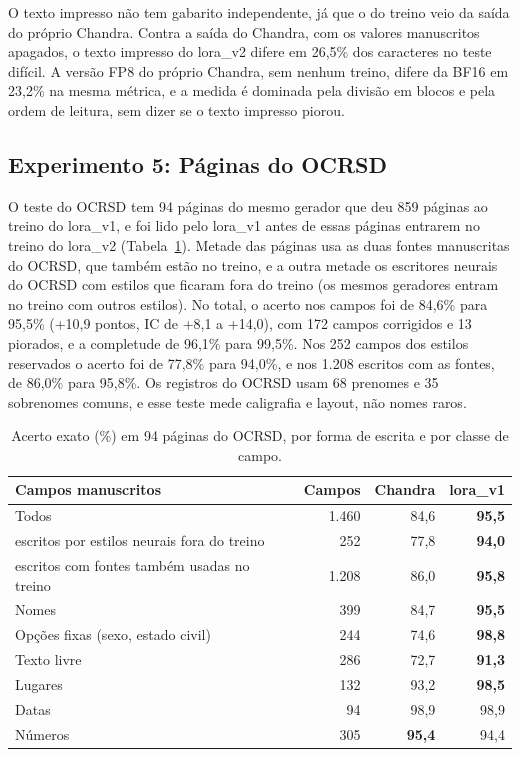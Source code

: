 O texto impresso não tem gabarito independente, já que o do treino veio da saída do próprio Chandra. Contra a saída do Chandra, com os valores manuscritos apagados, o texto impresso do lora\_v2 difere em 26,5\% dos caracteres no teste difícil. A versão FP8 do próprio Chandra, sem nenhum treino, difere da BF16 em 23,2\% na mesma métrica, e a medida é dominada pela divisão em blocos e pela ordem de leitura, sem dizer se o texto impresso piorou.

\subsection{Experimento 5: Páginas do OCRSD}
\label{subsec:exp5}

O teste do OCRSD tem 94 páginas do mesmo gerador que deu 859 páginas ao treino do lora\_v1, e foi lido pelo lora\_v1 antes de essas páginas entrarem no treino do lora\_v2 (Tabela~\ref{tab:ocrsd}). Metade das páginas usa as duas fontes manuscritas do OCRSD, que também estão no treino, e a outra metade os escritores neurais do OCRSD com estilos que ficaram fora do treino (os mesmos geradores entram no treino com outros estilos). No total, o acerto nos campos foi de 84,6\% para 95,5\% (+10,9 pontos, IC de +8,1 a +14,0), com 172 campos corrigidos e 13 piorados, e a completude de 96,1\% para 99,5\%. Nos 252 campos dos estilos reservados o acerto foi de 77,8\% para 94,0\%, e nos 1.208 escritos com as fontes, de 86,0\% para 95,8\%. Os registros do OCRSD usam 68 prenomes e 35 sobrenomes comuns, e esse teste mede caligrafia e layout, não nomes raros.

\begin{table}[H]
\centering
\small
\begin{tabular}{@{}lrrr@{}}
\toprule
Campos manuscritos & Campos & Chandra & lora\_v1 \\
\midrule
Todos & 1.460 & 84,6 & \textbf{95,5} \\
\quad escritos por estilos neurais fora do treino & 252 & 77,8 & \textbf{94,0} \\
\quad escritos com fontes também usadas no treino & 1.208 & 86,0 & \textbf{95,8} \\
\midrule
Nomes & 399 & 84,7 & \textbf{95,5} \\
Opções fixas (sexo, estado civil) & 244 & 74,6 & \textbf{98,8} \\
Texto livre & 286 & 72,7 & \textbf{91,3} \\
Lugares & 132 & 93,2 & \textbf{98,5} \\
Datas & 94 & 98,9 & 98,9 \\
Números & 305 & \textbf{95,4} & 94,4 \\
\bottomrule
\end{tabular}
\caption{Acerto exato (\%) em 94 páginas do OCRSD, por forma de escrita e por classe de campo.}
\label{tab:ocrsd}
\end{table}

